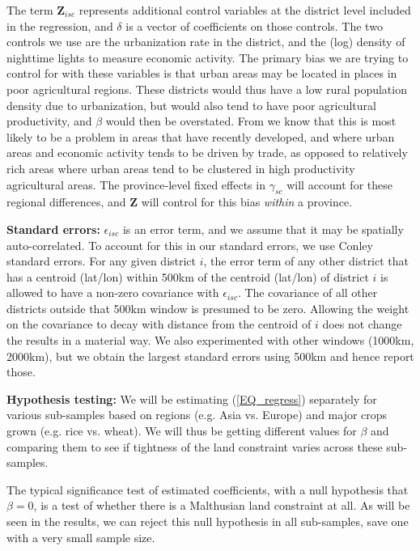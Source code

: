 \documentclass[11pt]{article}
\begin{document}
The term $\mathbf{Z}_{isc}$ represents additional control variables at the district level included in the regression, and $\delta$ is a vector of coefficients on those controls. The two controls we use are the urbanization rate in the district, and the (log) density of nighttime lights to measure economic activity. The primary bias we are trying to control for with these variables is that urban areas may be located in places in poor agricultural regions. These districts would thus have a low rural population density due to urbanization, but would also tend to have poor agricultural productivity, and $\beta$ would then be overstated. From \citet{hssw2016} we know that this is most likely to be a problem in areas that have recently developed, and where urban areas and economic activity tends to be driven by trade, as opposed to relatively rich areas where urban areas tend to be clustered in high productivity agricultural areas. The province-level fixed effects in $\gamma_{sc}$ will account for these regional differences, and $\mathbf{Z}$ will control for this bias \textit{within} a province.

\vspace{.5cm}\noindent\textbf{Standard errors:} $\epsilon_{isc}$ is an error term, and we assume that it may be spatially auto-correlated. To account for this in our standard errors, we use Conley standard errors. For any given district $i$, the error term of any other district that has a centroid (lat/lon) within 500km of the centroid (lat/lon) of district $i$ is allowed to have a non-zero covariance with $\epsilon_{isc}$. The covariance of all other districts outside that 500km window is presumed to be zero. Allowing the weight on the covariance to decay with distance from the centroid of $i$ does not change the results in a material way. We also experimented with other windows (1000km, 2000km), but we obtain the largest standard errors using 500km and hence report those.

\vspace{.5cm}\noindent\textbf{Hypothesis testing:} We will be estimating (\ref{EQ_regress}) separately for various sub-samples based on regions (e.g. Asia vs. Europe) and major crops grown (e.g. rice vs. wheat). We will thus be getting different values for $\beta$ and comparing them to see if tightness of the land constraint varies across these sub-samples.
 
The typical significance test of estimated coefficients, with a null hypothesis that $\beta=0$, is a test of whether there is a Malthusian land constraint at all. As will be seen in the results, we can reject this null hypothesis in all sub-samples, save one with a very small sample size.
\end{document}
